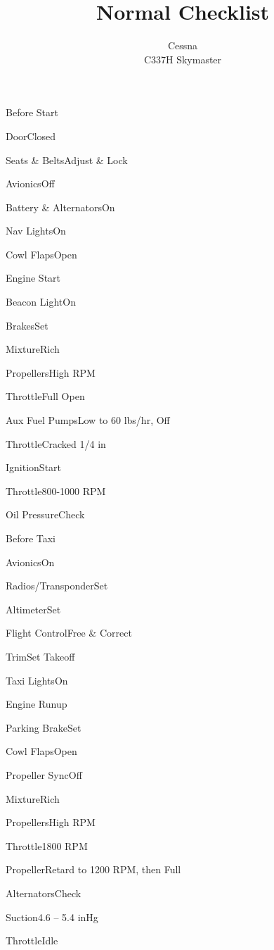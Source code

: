 \documentclass[sim-use]{checklist}
\title{Normal Checklist}
\subtitle{Cessna \\ C337H Skymaster}
\begin{document}
  

\begin{checklist}{Before Start}
  \item{Door}{Closed}
  \item{Seats \& Belts}{Adjust \& Lock}
  \item{Avionics}{Off}
  \item{Battery \& Alternators}{On}
  \item{Nav Lights}{On}
  \item{Cowl Flaps}{Open}
\end{checklist}
  
\begin{checklist}{Engine Start}
  \item{Beacon Light}{On}
  \item{Brakes}{Set}
  \item{Mixture}{Rich}
  \item{Propellers}{High RPM}
  \item{Throttle}{Full Open}
  \item{Aux Fuel Pumps}{Low to 60 lbs/hr, Off}
  \item{Throttle}{Cracked 1/4 in}
  \item{Ignition}{Start}
  \item{Throttle}{800-1000 RPM}
  \item{Oil Pressure}{Check}
\end{checklist}

\begin{checklist}{Before Taxi}
  \item{Avionics}{On}
  \item{Radios/Transponder}{Set}
  \item{Altimeter}{Set}
  \item{Flight Control}{Free \& Correct}
  \item{Trim}{Set Takeoff}
  \item{Taxi Lights}{On}
\end{checklist}

\begin{checklist}{Engine Runup}
  \item{Parking Brake}{Set}
  \item{Cowl Flaps}{Open}
  \item{Propeller Sync}{Off}
  \item{Mixture}{Rich}
  \item{Propellers}{High RPM}
  \item{Throttle}{1800 RPM}
  \item{Propeller}{Retard to 1200 RPM, then Full}
  \item{Alternators}{Check}
  \item{Suction}{4.6 -- 5.4 inHg}
  \item{Throttle}{Idle}
\end{checklist}
\end{document}
